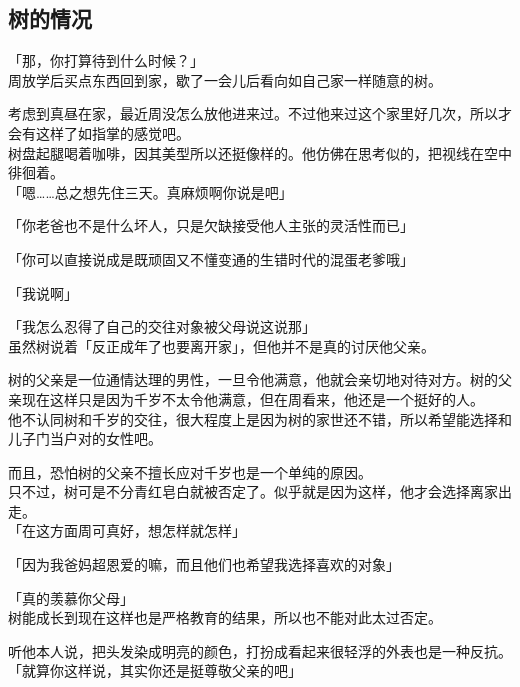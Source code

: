 \subsection{树的情况}

「那，你打算待到什么时候？」\\

周放学后买点东西回到家，歇了一会儿后看向如自己家一样随意的树。

考虑到真昼在家，最近周没怎么放他进来过。不过他来过这个家里好几次，所以才会有这样了如指掌的感觉吧。\\

树盘起腿喝着咖啡，因其美型所以还挺像样的。他仿佛在思考似的，把视线在空中徘徊着。\\

「嗯……总之想先住三天。真麻烦啊你说是吧」

「你老爸也不是什么坏人，只是欠缺接受他人主张的灵活性而已」

「你可以直接说成是既顽固又不懂变通的生错时代的混蛋老爹哦」

「我说啊」

「我怎么忍得了自己的交往对象被父母说这说那」\\

虽然树说着「反正成年了也要离开家」，但他并不是真的讨厌他父亲。

树的父亲是一位通情达理的男性，一旦令他满意，他就会亲切地对待对方。树的父亲现在这样只是因为千岁不太令他满意，但在周看来，他还是一个挺好的人。\\

他不认同树和千岁的交往，很大程度上是因为树的家世还不错，所以希望能选择和儿子门当户对的女性吧。

而且，恐怕树的父亲不擅长应对千岁也是一个单纯的原因。\\

只不过，树可是不分青红皂白就被否定了。似乎就是因为这样，他才会选择离家出走。\\

「在这方面周可真好，想怎样就怎样」

「因为我爸妈超恩爱的嘛，而且他们也希望我选择喜欢的对象」

「真的羡慕你父母」\\

树能成长到现在这样也是严格教育的结果，所以也不能对此太过否定。

听他本人说，把头发染成明亮的颜色，打扮成看起来很轻浮的外表也是一种反抗。\\

「就算你这样说，其实你还是挺尊敬父亲的吧」

